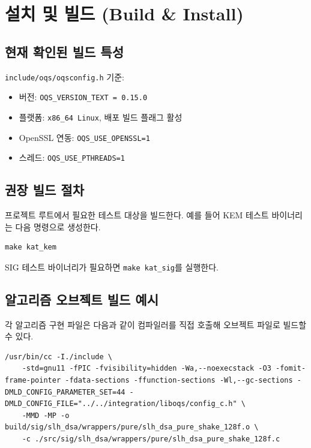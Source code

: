 \section{설치 및 빌드 (Build \& Install)}

\subsection{현재 확인된 빌드 특성}
\texttt{include/oqs/oqsconfig.h} 기준:
\begin{itemize}[leftmargin=*]
\item 버전: \texttt{OQS\_VERSION\_TEXT = 0.15.0}
\item 플랫폼: \texttt{x86\_64 Linux}, 배포 빌드 플래그 활성
\item OpenSSL 연동: \texttt{OQS\_USE\_OPENSSL=1}
\item 스레드: \texttt{OQS\_USE\_PTHREADS=1}
\end{itemize}

\subsection{권장 빌드 절차}
프로젝트 루트에서 필요한 테스트 대상을 빌드한다.
예를 들어 KEM 테스트 바이너리는 다음 명령으로 생성한다.

\begin{lstlisting}[style=cstyle,caption={테스트 바이너리 빌드 예시}]
make kat_kem
\end{lstlisting}

SIG 테스트 바이너리가 필요하면 \texttt{make kat\_sig}를 실행한다.

\subsection{알고리즘 오브젝트 빌드 예시}
각 알고리즘 구현 파일은 다음과 같이 컴파일러를 직접 호출해 오브젝트 파일로 빌드할 수 있다.

\begin{lstlisting}[style=cstyle,caption={SLH-DSA 구현 파일 컴파일 예시}]
/usr/bin/cc -I./include \
    -std=gnu11 -fPIC -fvisibility=hidden -Wa,--noexecstack -O3 -fomit-frame-pointer -fdata-sections -ffunction-sections -Wl,--gc-sections -DMLD_CONFIG_PARAMETER_SET=44 -DMLD_CONFIG_FILE="../../integration/liboqs/config_c.h" \
    -MMD -MP -o build/sig/slh_dsa/wrappers/pure/slh_dsa_pure_shake_128f.o \
    -c ./src/sig/slh_dsa/wrappers/pure/slh_dsa_pure_shake_128f.c
\end{lstlisting}

